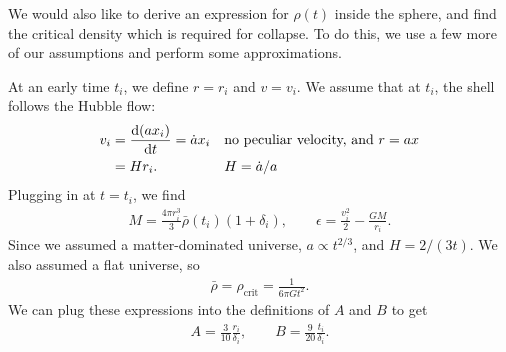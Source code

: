 We would also like to derive an expression for $\rho(t)$ inside the sphere, and find the critical density which is required for collapse. To do this, we use a few more of our assumptions and perform some approximations.

At an early time $t_i$, we define $r=r_i$ and $v = v_i$. We assume that at $t_i$, the shell follows the Hubble flow:
\begin{align*}
	v_i
	&= \dv{(a x_i)}{t} 
	= \dot{a} x_i &&\text{no peculiar velocity, and } r = a x\\
	&= H r_i.
	&& H = \dot{a}/a 
\end{align*}
Plugging in at $t=t_i$, we find
\begin{align*}
	M
	= \frac{4\pi r_i^3}{3}  \bar{\rho}(t_i)(1+\delta_i),
	\qquad
	\epsilon
	= \frac{v_i^2}{2}  - \frac{GM}{r_i}.
\end{align*}
Since we assumed a matter-dominated universe, $a \propto t^{2/3}$, and $H = 2/(3t)$. We also assumed a flat universe, so
\begin{align*}
	\bar{\rho}
	= \rho_\text{crit}
	= \frac{1}{6\pi G t^2}.
\end{align*}
We can plug these expressions into the definitions of $A$ and $B$ to get
\begin{align*}
	A = \frac{3}{10} \frac{r_i}{\delta_i},
	\qquad
	B = \frac{9}{20} \frac{t_i}{\delta_i}.
\end{align*}

